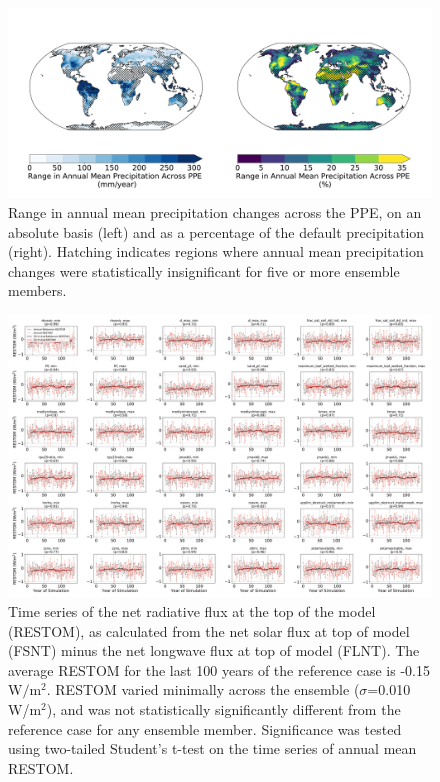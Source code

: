 \documentclass[draft,grl]{agutexSI2019}
\begin{document}
\begin{figure}[htb!]
\noindent\includegraphics[width=\textwidth]{writing/figs/PRECT_range_absolute_change.pdf}
\caption{Range in annual mean precipitation changes across the PPE, on an absolute basis (left) and as a percentage of the default precipitation (right). Hatching indicates regions where annual mean precipitation changes were statistically insignificant for five or more ensemble members.
}
\label{fig:supp_precip_range}
\end{figure}

\begin{figure}[htb!]
\noindent\includegraphics[width=\textwidth]
{writing/figs/Figure_S_Minimal_RESTOM_differences.pdf}
\caption{Time series of the net radiative flux at the top of the model (RESTOM), as calculated from the net solar flux at top of model (FSNT) minus the net longwave flux at top of model (FLNT). The average RESTOM for the last 100 years of the reference case is -0.15 W$/$m$^2$. RESTOM varied minimally across the ensemble ($\sigma$=0.010 W/m$^2$), and was not statistically significantly different from the reference case for any ensemble member. Significance was tested using two-tailed Student’s t-test on the  time series of annual mean RESTOM.}
\label{fig:supp_TOA_energy_balance}
\end{figure}
\end{document}
